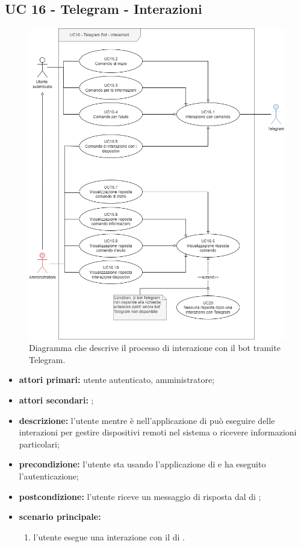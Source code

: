 \subsection{UC 16 - Telegram - Interazioni}

	\begin{figure}[H]
		\centering
		\includegraphics[scale=0.60]{res/images/uc16}
		\caption{Diagramma che descrive il processo di interazione con il bot tramite Telegram.}
	\end{figure}

	\begin{itemize}
		\item \textbf{attori primari:} utente autenticato, amministratore;
		\item \textbf{attori secondari:} ;
		\item \textbf{descrizione:} l'utente mentre è nell'applicazione di  può eseguire delle interazioni per gestire dispositivi remoti nel sistema o ricevere informazioni particolari;
		\item \textbf{precondizione:} l'utente sta usando l'applicazione di  e ha eseguito l'autenticazione;
		\item \textbf{postcondizione:} l'utente riceve un messaggio di risposta dal  di ;
		\item \textbf{scenario principale:}
		\begin{enumerate}
			\item l'utente esegue una interazione con il  di .
		\end{enumerate}
	\end{itemize}

